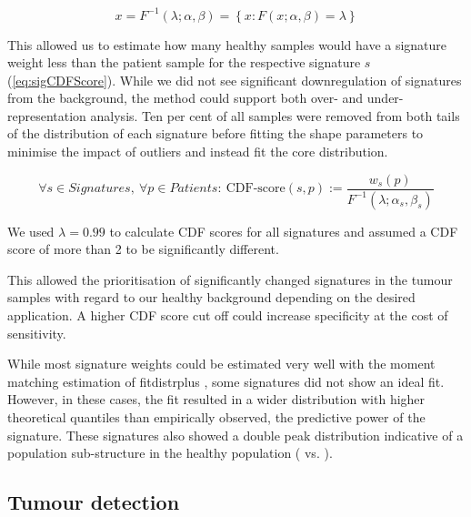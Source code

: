 \begin{equation}
x = F^{-1}(\lambda; \alpha ,\beta) = \left\{ x: F(x; \alpha, \beta) = \lambda \right\}
\label{eq:invBetaCDF} 
\end{equation}
\myequation[\ref{eq:invBetaCDF}]{Inverse beta distribution cumulative density function}


This allowed us to estimate how many healthy samples would have a signature weight less than the patient sample for the respective signature $s$ (\autoref{eq:sigCDFScore}). While we did not see significant downregulation of signatures from the background, the method could support both over- and under-re\-pre\-sentation analysis. Ten per cent of all samples were removed from both tails of the distribution of each signature before fitting the shape parameters to minimise the impact of outliers and instead fit the core distribution.

\begin{equation}
\forall s \in Signatures,\ \forall p \in Patients:\ \text{CDF-score}(s,p) := \frac{w_s(p)}{F^{-1}(\lambda; \alpha_s ,\beta_s)}
\label{eq:sigCDFScore}
\end{equation}
\myequation[\ref{eq:sigCDFScore}]{MisMatchFinder: CDF score calculation per signature and patient}

We used $\lambda = 0.99$ to calculate CDF scores for all signatures and assumed a CDF score of more than 2 to be significantly different.

This allowed the prioritisation of significantly changed signatures in the tumour samples with regard to our healthy background depending on the desired application. A higher CDF score cut off could increase specificity at the cost of sensitivity.

While most signature weights could be estimated very well with the moment matching estimation of fitdistrplus \cite{DelignetteMuller2015}, some signatures did not show an ideal fit. However, in these cases, the fit resulted in a wider distribution with higher theoretical quantiles than empirically observed,  the predictive power of the signature. These signatures also showed a double peak distribution indicative of a population sub-structure in the healthy population ( vs. ).


\subsection{Tumour detection}
\label{mmf-sec:tumourdetection}

